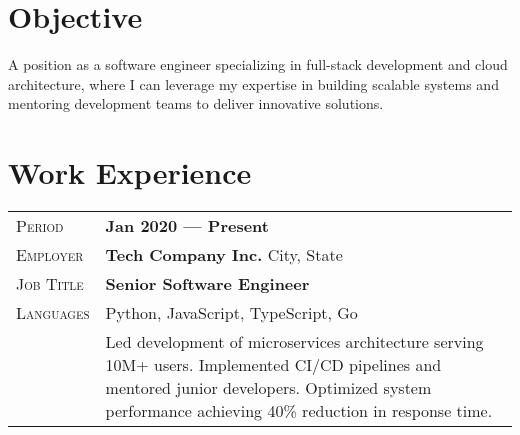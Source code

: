 \documentclass[a4paper, oneside, final]{scrartcl} %
\newcommand{\gray}{\rowcolor[gray]{.90}} %
\begin{document}
\begin{center} %


{\fontsize{36}{36}\selectfont\scshape{}} %

\vspace{1cm} %


\section{Objective}

A position as a software engineer specializing in full-stack development and cloud architecture, where I can leverage my expertise in building scalable systems and mentoring development teams to deliver innovative solutions.


\section{Work Experience}

\begin{tabularx}{0.97\linewidth}{>{\raggedleft\scshape}p{2cm}X}
\gray Period & \textbf{Jan 2020 --- Present}\\
\gray Employer & \textbf{Tech Company Inc.} \hfill City, State\\
\gray Job Title & \textbf{Senior Software Engineer}\\
\gray Languages & Python, JavaScript, TypeScript, Go\\
       & Led development of microservices architecture serving 10M+ users. Implemented CI/CD pipelines and mentored junior developers. Optimized system performance achieving 40\% reduction in response time.\\
\end{tabularx}


\end{center}
\end{document}
